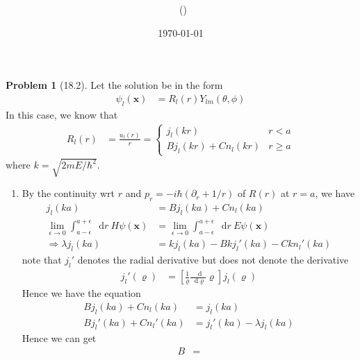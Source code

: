\documentclass[twoside,11pt]{article}
\title{{\lms \Code \ \Ass}}
\author{\lms \name \ (\href{mailto:\mail}{\mail})}
\date{\sffamily \today}
\makeatletter
\renewcommand*\d{\mathop{}\!\mathrm{d}}
\theoremstyle{definition}
\newtheorem{problem}{Problem}
\theoremstyle{remark}
\newtheorem*{remark}{Remark}
\renewcommand{\maketitle}{\bgroup\setlength{\parindent}{0pt}
\begin{flushleft}
  \textbf{\Large\@title}

  \@author
\end{flushleft}\egroup
}
\makeatother
\begin{document}
\maketitle
\thispagestyle{title}



\begin{problem}[18.2]
Let the solution be in the form
\begin{align*}
    \psi_l(\mathbf{x}) &= R_l(r)Y_{lm}(\theta, \phi)
\end{align*}
In this case, we know that 
\begin{align*}
    R_l(r) &= \frac{u_l(r)}{r} = \begin{cases}
        j_l(kr) & r < a\\
        B j_l(kr) + C n_l(kr) & r \geq a
    \end{cases}
\end{align*}
where $k=\sqrt{2mE/\hbar^2}$.
\begin{enumerate}[label=(\alph*)]
\item By the continuity wrt $r$ and $p_r=-i\hbar(\partial_r + 1/r)$ of $R(r)$
at $r=a$, we have
\begin{align*}
    j_l(ka) &= B j_l(ka) + C n_l(ka)\\
    \lim_{\epsilon\rightarrow 0}
    \int_{a-\epsilon}^{a+\epsilon} \d r\ H\psi(\mathbf{x}) &= 
    \lim_{\epsilon\rightarrow 0}
    \int_{a-\epsilon}^{a+\epsilon} \d r\ E\psi(\mathbf{x})\\
    \Rightarrow
    \lambda j_l(ka) &= 
    kj_l(ka) - Bk j_l'(ka) - Ck n_l'(ka)
\end{align*}
note that $j_l'$ denotes the radial derivative but does not denote the derivative
\begin{align*}
    j_l'(\varrho) &= \left[\frac{1}{\varrho}\frac{\d}{\d\varrho}\varrho\right] j_l(\varrho)
\end{align*}
Hence we have the equation
\begin{align*}
    Bj_l(ka) + Cn_l(ka) &= j_l(ka)\\
    Bj_l'(ka) + Cn_l'(ka) &= j_l'(ka) - \lambda j_l(ka)
\end{align*}
Hence we can get
\begin{align*}
    B &= 
\end{align*}


\end{enumerate}
\end{problem}
\end{document}
